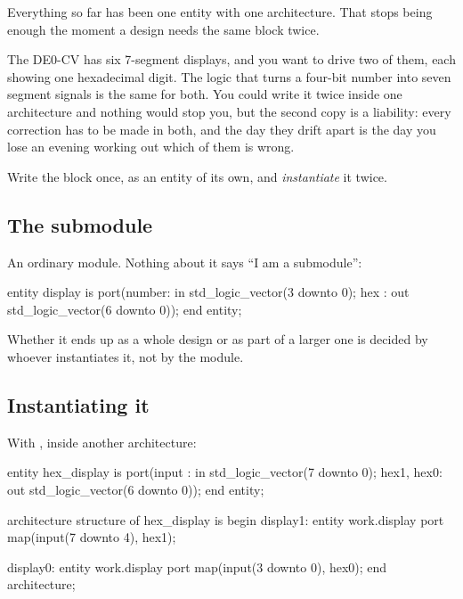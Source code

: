 Everything so far has been one entity with one architecture. That stops being enough the moment a
design needs the same block twice.

The DE0-CV has six 7-segment displays, and you want to drive two of them, each showing one
hexadecimal digit. The logic that turns a four-bit number into seven segment signals is the same
for both. You could write it twice inside one architecture and nothing would stop you, but the
second copy is a liability: every correction has to be made in both, and the day they drift apart
is the day you lose an evening working out which of them is wrong.

Write the block once, as an entity of its own, and \emph{instantiate} it twice.

\subsection*{The submodule}
An ordinary module. Nothing about it says ``I am a submodule'':

\begin{vhdlcode}
entity display is
    port(number: in  std_logic_vector(3 downto 0);
         hex   : out std_logic_vector(6 downto 0));
end entity;
\end{vhdlcode}

Whether it ends up as a whole design or as part of a larger one is decided by whoever instantiates
it, not by the module.

\subsection*{Instantiating it}
With , inside another architecture:

\begin{vhdlcode}
entity hex_display is
    port(input     : in  std_logic_vector(7 downto 0);
         hex1, hex0: out std_logic_vector(6 downto 0));
end entity;

architecture structure of hex_display is
begin
    display1: entity work.display
        port map(input(7 downto 4), hex1);

    display0: entity work.display
        port map(input(3 downto 0), hex0);
end architecture;
\end{vhdlcode}


